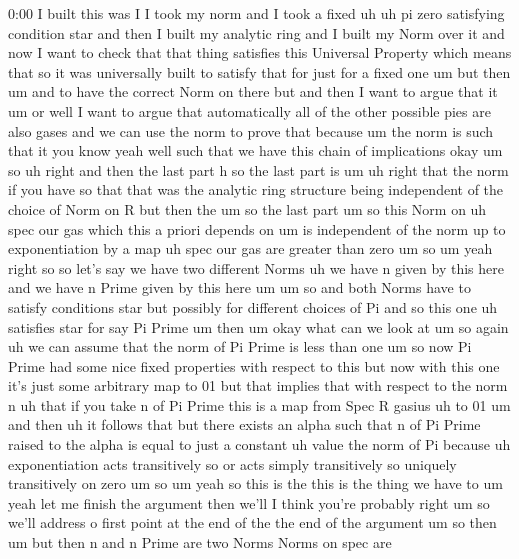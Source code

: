 \begin{unfinished}{0:00}
I  built  this  was  I  I  took  my  norm  and  I
took  a
fixed  uh  uh  pi  zero  satisfying  condition
star  and  then  I  built  my  analytic  ring
and  I  built  my  Norm  over  it  and  now  I
want  to  check  that  that  thing  satisfies
this  Universal  Property  which  means  that
so  it  was  universally  built  to  satisfy
that  for  just  for  a  fixed  one  um  but
then  um  and  to  have  the  correct  Norm  on
there  but  and  then  I  want  to  argue  that
it
um  or
well  I  want  to  argue  that  automatically
all  of  the  other  possible  pies  are  also
gases  and  we  can  use  the  norm  to  prove
that
because  um  the  norm  is  such  that  it  you
know  yeah  well  such  that  we  have  this
chain  of
implications
okay
um  so  uh  right  and  then  the  last  part
h
so  the  last  part  is
um  uh  right  that  the  norm  if  you  have  so
that  that  was  the  analytic  ring
structure  being  independent  of  the
choice  of  Norm  on  R  but  then  the  um  so
the  last
part  um  so  this  Norm  on  uh
spec  our  gas  which  this  a  priori  depends
on  um  is
independent  of  the  norm  up  to
exponentiation  by  a
map  uh  spec  our
gas  are  greater  than  zero
um  so
um  yeah
right
so  so  let's  say  we  have  two  different
Norms  uh  we  have  n  given  by  this  here
and  we  have  n  Prime  given  by  this
here
um  um  so  and  both  Norms  have  to  satisfy
conditions  star  but  possibly  for
different  choices  of
Pi  and  so  this  one  uh
satisfies  star  for  say  Pi
Prime
um  then  um  okay  what  can  we  look  at
um
so  again  uh  we  can  assume  that  the  norm
of  Pi  Prime  is  less  than  one  um  so  now
Pi  Prime  had  some  nice  fixed  properties
with  respect  to  this  but  now  with  this
one  it's  just  some  arbitrary  map  to  01
but  that  implies  that  with  respect  to
the  norm  n  uh  that  if  you  take  n  of  Pi
Prime  this  is  a  map  from  Spec  R  gasius
uh  to
01  um  and  then  uh  it  follows  that  but
there  exists  an  alpha  such  that  n  of  Pi
Prime  raised  to  the  alpha  is  equal  to
just  a  constant  uh  value  the  norm  of
Pi  because  uh  exponentiation  acts
transitively  so  or  acts  simply
transitively
so  uniquely  transitively
on
zero
um  so
um  yeah  so  this  is  the  this  is  the  thing
we  have  to
um  yeah  let  me  finish  the  argument  then
we'll  I  think  you're  probably  right  um
so  we'll  address  o  first  point  at  the
end  of  the  the  end  of  the  argument  um  so
then  um  but  then  n  and  n  Prime  are  two
Norms  Norms  on
spec  are

\end{unfinished}

